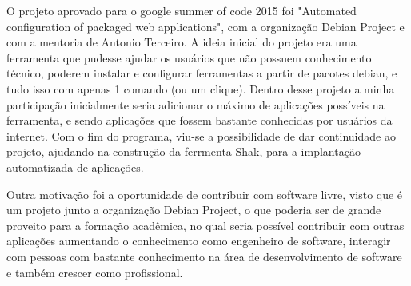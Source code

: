 O projeto aprovado para o google summer of code 2015 foi "Automated configuration
of packaged web applications", com a organização Debian Project e com a mentoria de
Antonio Terceiro. A ideia inicial do projeto era uma ferramenta que
pudesse ajudar os usuários que não possuem conhecimento técnico, poderem
instalar e configurar ferramentas a partir de pacotes debian, e tudo isso com
apenas 1 comando (ou um clique). Dentro desse projeto a minha participação
inicialmente seria adicionar o máximo de aplicações possíveis na ferramenta,
e sendo aplicações que fossem bastante conhecidas por usuários da internet. Com o
 fim do programa, viu-se a possibilidade de dar continuidade ao projeto, ajudando
na construção da ferrmenta Shak, para a implantação automatizada de aplicações.

Outra motivação foi a oportunidade de contribuir com software livre, visto que é
um projeto junto a organização Debian Project, o que poderia ser de grande proveito
para a formação acadêmica, no qual seria possível contribuir com outras
aplicações aumentando o conhecimento como engenheiro de software, interagir com
pessoas com bastante conhecimento na área de desenvolvimento de software e também
crescer como profissional.
